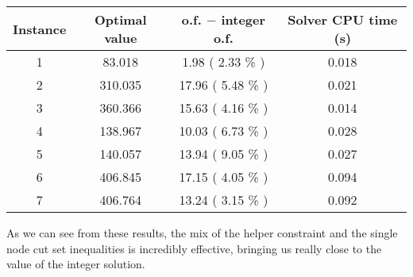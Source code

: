 \begin{table}[h!]
	\centering
	\begin{tabular}{|c|c|c|c|}
		\hline
		\textbf{Instance} & \textbf{Optimal value} & \textbf{o.f. $-$ integer o.f.} & \textbf{Solver CPU time (s)} \\
		\hline
		1 &  83.018 &  1.98 ( 2.33 \% ) & 0.018 \\ \hline
		2 & 310.035 & 17.96 ( 5.48 \% ) & 0.021 \\ \hline
		3 & 360.366 & 15.63 ( 4.16 \% ) & 0.014 \\ \hline
		4 & 138.967 & 10.03 ( 6.73 \% ) & 0.028 \\ \hline
		5 & 140.057 & 13.94 ( 9.05 \% ) & 0.027 \\ \hline
		6 & 406.845 & 17.15 ( 4.05 \% ) & 0.094 \\ \hline
		7 & 406.764 & 13.24 ( 3.15 \% ) & 0.092 \\ \hline
	\end{tabular}
	\label{tab:instance_costs}
\end{table}

As we can see from these results, the mix of the helper constraint and the single node cut set inequalities is incredibly effective, bringing us really close to the value of the integer solution.
